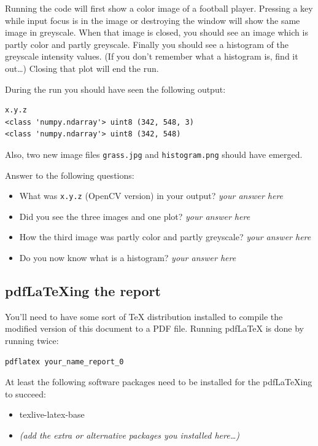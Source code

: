 \documentclass{article}
\begin{document}
Running the code will first show a color image of a football player.
Pressing a key while input focus is in the image or destroying the
window will show the same image in greyscale.  When that image is
closed, you should see an image which is partly color and partly
greyscale.  Finally you should see a histogram of the greyscale
intensity values.  (If you don't remember what a histogram is, find it
out\ldots) Closing that plot will end the run.

During the run you should have seen the following output:

\begin{verbatim}
x.y.z
<class 'numpy.ndarray'> uint8 (342, 548, 3)
<class 'numpy.ndarray'> uint8 (342, 548)
\end{verbatim}

Also, two new image files \texttt{grass.jpg} and
\texttt{histogram.png} should have emerged.

Answer to the following questions:

\begin{itemize}
\item What was \texttt{x.y.z} (OpenCV version) in your output? \emph{your answer here} 
\item Did you see the three images and one plot? \emph{your answer here} 
\item How the third image was partly color and partly greyscale? \emph{your answer here} 
\item Do you now know what is a histogram? \emph{your answer here} 
\end{itemize}


\subsection{pdf\LaTeX{}ing the report}

You'll need to have some sort of \TeX{} distribution installed to
compile the modified version of this document to a PDF file.  Running
pdf\LaTeX{} is done by running twice:

\begin{verbatim}
pdflatex your_name_report_0
\end{verbatim}

At least the following software packages need to be installed for the
pdf\LaTeX{}ing to succeed:

\begin{itemize}
\item texlive-latex-base
\item \emph{(add the extra or alternative packages you installed here\ldots)}
\end{itemize}
\end{document}
